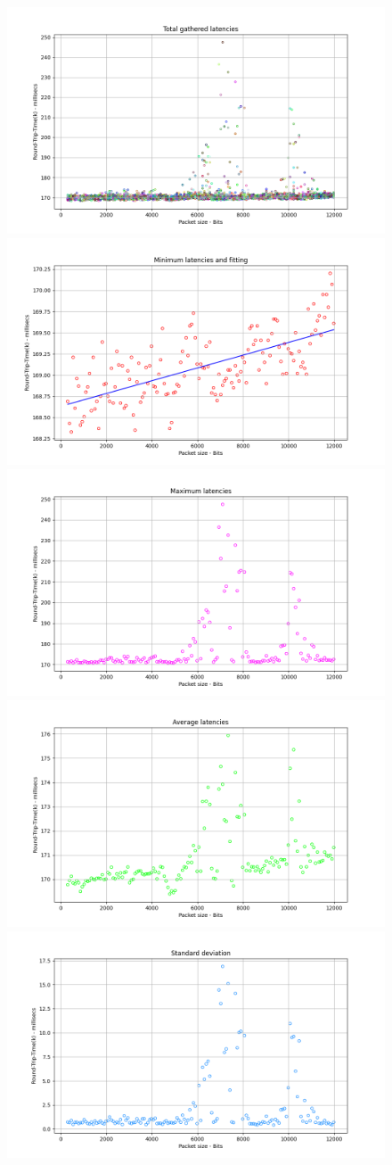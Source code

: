 \begin{figure}
    \centering
    \includegraphics[width = .9\textwidth]{hw-2/report/imgs/20-instances/la-total-latencies.png}
    \includegraphics[width = .49\textwidth]{hw-2/report/imgs/20-instances/la-min-latencies.png}
    \includegraphics[width = .49\textwidth]{hw-2/report/imgs/20-instances/la-max-latencies.png}
    \includegraphics[width = .49\textwidth]{hw-2/report/imgs/20-instances/la-avg-latencies.png}
    \includegraphics[width = .49\textwidth]{hw-2/report/imgs/20-instances/la-standard-deviation.png}
\end{figure}

